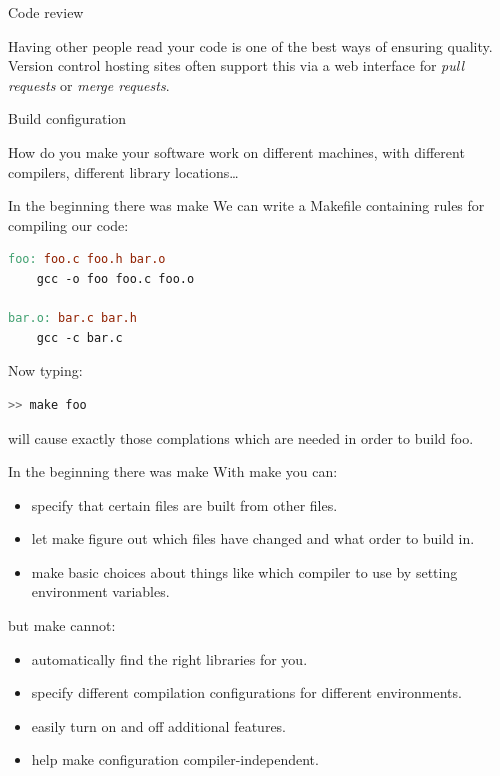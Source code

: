 \documentclass[t]{beamer}
\begin{document}
\begin{frame}{Code review}
  
  Having other people read your code is one of the best ways of ensuring
  quality. Version control hosting sites often support this via a web
  interface for \emph{pull requests} or \emph{merge requests}.

\end{frame}





  

\begin{frame}{Build configuration}

  How do you make your software work on different machines, with different
  compilers, different library locations\ldots
  
\end{frame}

\begin{frame}[fragile]{In the beginning there was make}
  We can write a Makefile containing rules for compiling our code:
  \begin{lstlisting}[language=make]
foo: foo.c foo.h bar.o 
    gcc -o foo foo.c foo.o

bar.o: bar.c bar.h
    gcc -c bar.c
  \end{lstlisting}

  Now typing:
  \begin{lstlisting}[language=bash]
>> make foo
  \end{lstlisting}
  will cause exactly those complations which are needed in order to build foo.
  
\end{frame}

\begin{frame}{In the beginning there was make}
  With make you can:
  \begin{itemize}
  \item specify that certain files are built from other files.
  \item let make figure out which files have changed and what order to build in.
  \item make basic choices about things like which compiler to use by
    setting environment variables.
  \end{itemize}
  but make cannot:
  \begin{itemize}
  \item automatically find the right libraries for you.
  \item specify different compilation configurations for different environments.
  \item easily turn on and off additional features.
  \item help make configuration compiler-independent.
  \end{itemize}
\end{frame}
\end{document}
